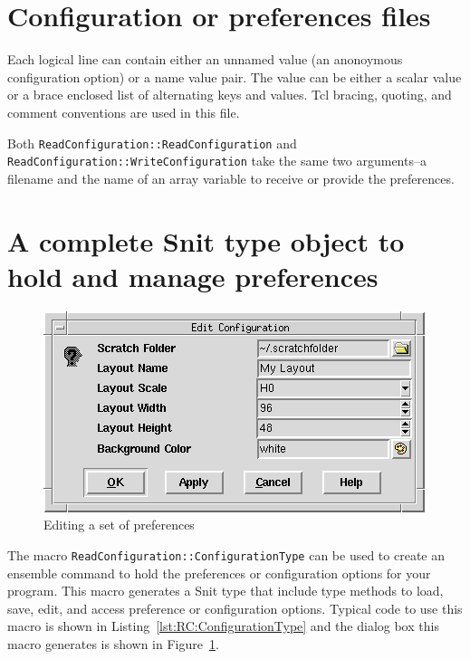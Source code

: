 \section{Configuration or preferences files}

Each logical line can contain either an unnamed value (an anonoymous
configuration option) or a name value pair.  The value can be either a
scalar value or a brace enclosed list of alternating keys and values.
Tcl bracing, quoting, and comment conventions are used in this file.

Both \lstinline=ReadConfiguration::ReadConfiguration= and
\lstinline=ReadConfiguration::WriteConfiguration= take the same two
arguments--a filename and the name of an array variable to receive or
provide the preferences.

\section{A complete Snit type object to hold and manage preferences}


\begin{figure}[hbpt]
\begin{centering}   
\includegraphics{EditConf.png}
\caption{Editing a set of preferences}
\label{fig:RC:EditConf}
\end{centering}
\end{figure}
The macro \lstinline=ReadConfiguration::ConfigurationType= can be used
to create an ensemble command to hold the preferences or configuration
options for your program.  This macro generates a Snit type that include
type methods to load, save, edit, and access preference or configuration
options. Typical code to use this macro is shown in
Listing~\ref{lst:RC:ConfigurationType} and the dialog box this macro
generates is shown in Figure~\ref{fig:RC:EditConf}.

